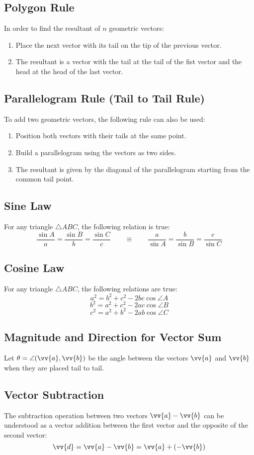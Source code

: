 		\subsection{Polygon Rule}
			In order to find the resultant of $n$ geometric vectors:
			\begin{enumerate}
				\item Place the next vector with its tail on the tip of the previous vector.
				\item The resultant is a vector with the tail at the tail of the fist vector and the head at the head of the last vector.
			\end{enumerate}
		\subsection{Parallelogram Rule (Tail to Tail Rule)}
			To add two geometric vectors, the following rule can also be used:
			\begin{enumerate}
				\item Position both vectors with their tails at the same point.
				\item Build a parallelogram using the vectors as two sides.
				\item The resultant is given by the diagonal of the parallelogram starting from the common tail point.
			\end{enumerate}
		\subsection{Sine Law}
			For any triangle $\triangle ABC$, the following relation is true:
			\[\frac{\sin A}{a} = \frac{\sin B}{b} = \frac{\sin C}{c} \qquad \equiv \qquad \frac{a}{\sin A} = \frac{b}{\sin B} = \frac{c}{\sin C}\]
		\subsection{Cosine Law}
			For any triangle $\triangle ABC$, the following relations are true:
			\[a^2 = b^2 + c^2 - 2bc\cos\angle A\]
			\[b^2 = a^2 + c^2 - 2ac\cos\angle B\]
			\[c^2 = a^2 + b^2 - 2ab\cos\angle C\]
		\subsection{Magnitude and Direction for Vector Sum}
			Let $\theta = \angle(\vv{a}, \vv{b})$ be the angle between the vectors $\vv{a}$ and $\vv{b}$ when they are placed tail to tail.
		\subsection{Vector Subtraction}
			The subtraction operation between two vectors $\vv{a} - \vv{b}$ can be understood as a vector addition between the first vector and the opposite of the second vector:
			\[\vv{d} = \vv{a} - \vv{b} = \vv{a} + (-\vv{b})\]
